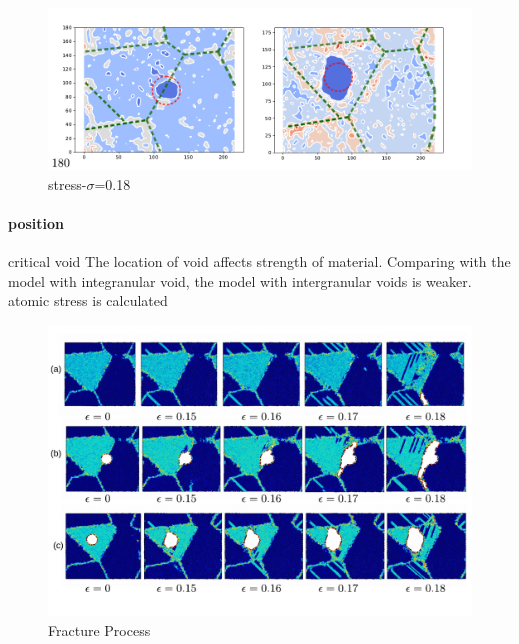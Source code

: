 \documentclass[final,5pt,times]{elsarticle}
\begin{document}
	
	\begin{figure}[h]
		\centering
		\includegraphics[width=0.7\linewidth]{img/frame180}
		\caption{stress-$\sigma$=0.18}
		\label{ }
	\end{figure}
	\paragraph{position}critical void 
	The location of void affects strength of material. Comparing with the model with integranular void, the model with intergranular voids is weaker. atomic stress is calculated 
	
	\begin{figure}[h]
		\centering
		\includegraphics[width=1\linewidth]{"img/fracture3"}
		\caption{Fracture Process}
		\label{fig:fracture-process}
	\end{figure}
	
	
	
	
	
\end{document}

